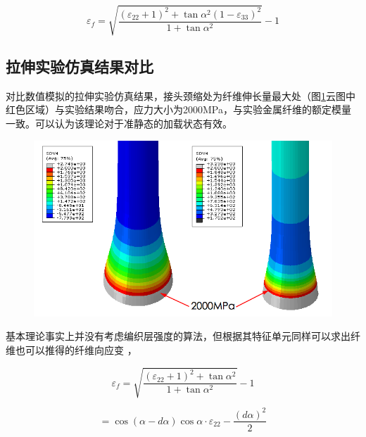 \begin{equation}
\label{eq:fiber-elongation}
{\varepsilon _f} = \sqrt {\frac{{{{\left( {{\varepsilon _{22}} + 1} \right)}^2} + \tan {\alpha ^2}{{\left( {1 - {\varepsilon _{33}}} \right)}^2}}}{{1 + \tan {\alpha ^2}}}}  - 1
\end{equation}



\subsection{拉伸实验仿真结果对比}

对比数值模拟的拉伸实验仿真结果，接头颈缩处为纤维伸长量最大处（图\ref{fig:strength}云图中红色区域）与实验结果吻合，应力大小为2000MPa，与实验金属纤维的额定模量一致。可以认为该理论对于准静态的加载状态有效。

\begin{figure}[!htb]
\centering
\emph{}\includegraphics[height=0.25\textheight]{figure/chap6/strength}
\label{fig:strength}
\end{figure}

\ha 基本理论事实上并没有考虑编织层强度的算法，但根据其特征单元同样可以求出纤维也可以推得的纤维向应变 ，

\[{\varepsilon _f} = \sqrt {\frac{{{{\left( {{\varepsilon _{22}} + 1} \right)}^2} + \tan {\alpha ^2}}}{{1 + \tan {\alpha ^2}}}}  - 1\]

\begin{equation}
= \cos \left( {\alpha  - d\alpha } \right)\cos \alpha  \cdot {\varepsilon _{22}} - \frac{{{{\left( {d\alpha } \right)}^2}}}{2}
\end{equation}

